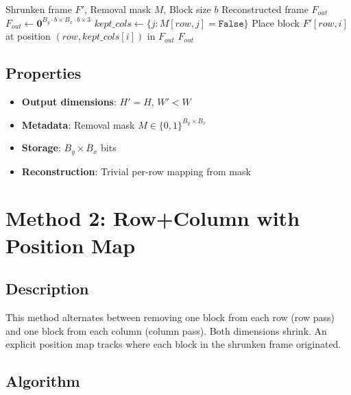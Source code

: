 \documentclass[11pt,a4paper]{article}
\begin{document}
\begin{algorithm}[H]
\caption{Stretch Frame (Row-Only)}
\begin{algorithmic}[1]
\Require Shrunken frame $F'$, Removal mask $M$, Block size $b$
\Ensure Reconstructed frame $F_{out}$
\State $F_{out} \gets \mathbf{0}^{B_y \cdot b \times B_x \cdot b \times 3}$
    \State $kept\_cols \gets \{j : M[row, j] = \texttt{False}\}$
        \State Place block $F'[row, i]$ at position $(row, kept\_cols[i])$ in $F_{out}$
    \EndFor
\EndFor
\State \Return $F_{out}$
\end{algorithmic}
\end{algorithm}

\subsection{Properties}
\begin{itemize}
    \item \textbf{Output dimensions}: $H' = H$, $W' < W$
    \item \textbf{Metadata}: Removal mask $M \in \{0,1\}^{B_y \times B_x}$
    \item \textbf{Storage}: $B_y \times B_x$ bits
    \item \textbf{Reconstruction}: Trivial per-row mapping from mask
\end{itemize}

\section{Method 2: Row+Column with Position Map}

\subsection{Description}
This method alternates between removing one block from each row (row pass) and one block from each column (column pass). Both dimensions shrink. An explicit position map tracks where each block in the shrunken frame originated.

\subsection{Algorithm}
\end{document}
